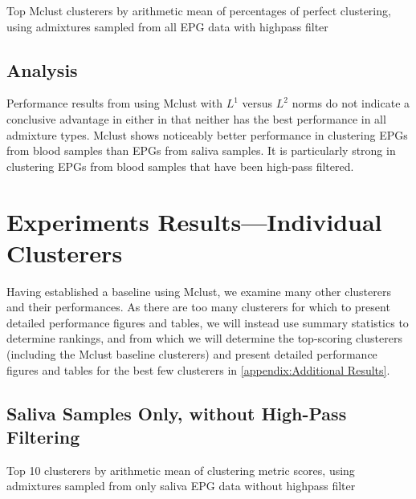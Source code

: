 \begin{table}[htbp]
\centering
{}
\caption{Top Mclust clusterers by arithmetic mean of percentages of perfect clustering, using admixtures sampled from all EPG data with highpass filter}
\label{table:top_mclust_clusterers_by_binomial_confidence_highpass_71-sampleids_all-nruns_1000}
\end{table}

\FloatBarrier
\subsection{Analysis}

Performance results from using Mclust with $L^{1}$ versus $L^{2}$ norms do not indicate a conclusive advantage in either in that neither has the best performance in all admixture types. Mclust shows noticeably better performance in clustering EPGs from blood samples than EPGs from saliva samples. It is particularly strong in clustering EPGs from blood samples that have been high-pass filtered.

\section{Experiments Results---Individual Clusterers}

Having established a baseline using Mclust, we examine many other clusterers and their performances. As there are too many clusterers for which to present detailed performance figures and tables, we will instead use summary statistics to determine rankings, and from which we will determine the top-scoring clusterers (including the Mclust baseline clusterers) and present detailed performance figures and tables for the best few clusterers in \cref{appendix:Additional Results}.

\FloatBarrier
\subsection{Saliva Samples Only, without High-Pass Filtering}

\begin{table}[htbp]
\centering
{}
\caption{Top 10 clusterers by arithmetic mean of clustering metric scores, using admixtures sampled from only saliva EPG data without highpass filter}
\label{table:top_10_not_ensemble_clusterers_by_metrics_highpass_0-sampleids_saliva-nruns_1000}
\end{table}

